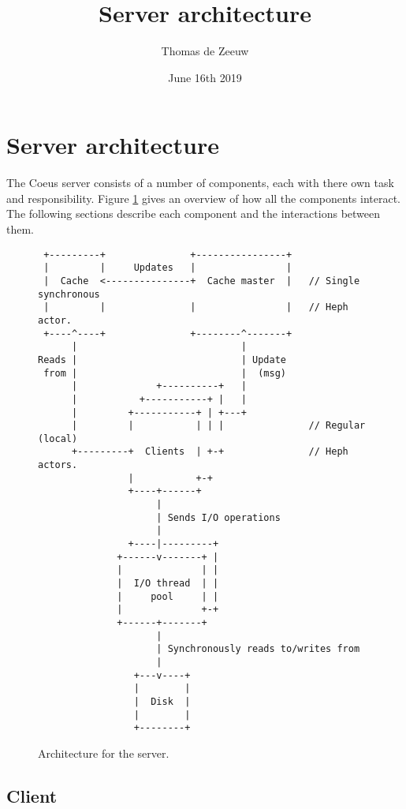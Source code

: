 \documentclass{scrartcl}
\title{Server architecture}
\author{Thomas de Zeeuw}
\date{June 16th 2019}
\begin{document}
\maketitle

\section{Server architecture} \label{sec:srv}

The Coeus server consists of a number of components, each with there own task
and responsibility. Figure \ref{fig:server_design} gives an overview of how all
the components interact. The following sections describe each component and
the interactions between them.


\begin{figure}
\begin{verbatim}
 +---------+               +----------------+
 |         |     Updates   |                |
 |  Cache  <---------------+  Cache master  |   // Single synchronous
 |         |               |                |   // Heph actor.
 +----^----+               +--------^-------+
      |                             |
Reads |                             | Update
 from |                             |  (msg)
      |              +----------+   |
      |           +-----------+ |   |
      |         +-----------+ | +---+
      |         |           | | |               // Regular (local)
      +---------+  Clients  | +-+               // Heph actors.
                |           +-+
                +----+------+
                     |
                     | Sends I/O operations
                     |
                +----|---------+
              +------v-------+ |
              |              | |
              |  I/O thread  | |
              |     pool     | |
              |              +-+
              +------+-------+
                     |
                     | Synchronously reads to/writes from
                     |
                 +---v----+
                 |        |
                 |  Disk  |
                 |        |
                 +--------+
\end{verbatim}
\caption{Architecture for the server.}
\label{fig:server_design}
\end{figure}


\subsection{Client} \label{sec:srv_client}
\end{document}

